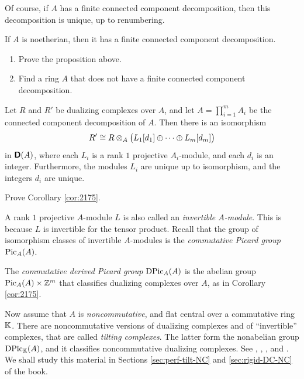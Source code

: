Of course, if $A$ has a finite connected component decomposition, then 
this decomposition is unique, up to renumbering. 

\begin{prop} \label{prop:5080}
If $A$ is noetherian, then it has a finite connected component decomposition.
\end{prop}

\begin{exer} \label{exer:5080} \mbox{}
\begin{enumerate}
\item Prove the proposition above. 

\item Find a ring $A$ that does not have a finite connected component 
decomposition.
\end{enumerate}
\end{exer}

\begin{cor} \label{cor:2175}
Let $R$ and $R'$ be dualizing complexes over $A$, and let 
$A = \prod_{i = 1}^m A_i$ be the connected component decomposition of $A$.
Then there is an isomorphism 
\[ R' \cong R \otimes_A \bigl( L_1[d_1] \oplus \cdots \oplus L_m[d_m] \bigr) \]
in $\boldsymbol{\mathsf{D}}(A)$, where each $L_i$ is a rank $1$ projective 
$A_i$-module, and each $d_i$ is an integer. Furthermore, the modules $L_i$ are 
unique up to isomorphism, and the integers $d_i$ are unique. 
\end{cor}

\begin{exer} \label{exer:2176}
Prove Corollary \ref{cor:2175}.
\end{exer}

\begin{rem} \label{rem:2195}
A rank $1$ projective $A$-module $L$ is also called an {\em invertible 
$A$-module}. This is because $L$ is invertible for the tensor product. 
Recall that the group of isomorphism classes of invertible $A$-modules is 
the {\em commutative Picard group} $\operatorname{Pic}_A(A)$. 

The {\em commutative derived Picard group} $\operatorname{DPic}_A(A)$ is the abelian 
group $\operatorname{Pic}_A(A) \times \mathbb{Z}^m$ that classifies dualizing complexes over 
$A$, as in Corollary \ref{cor:2175}.

Now assume that $A$ is {\em noncommutative}, and flat central over a 
commutative ring $\mathbb{K}$. There are noncommutative versions of dualizing complexes 
and of ``invertible'' complexes, that are called {\em tilting complexes}. The 
latter form the nonabelian group $\operatorname{DPic}_{\mathbb{K}}(A)$, and it classifies 
noncommutative dualizing complexes. See
\cite{Ric1}, \cite{Ric2}, \cite{Kel1}, \cite{Ye4} and \cite{RoZi}. 
We shall study this material in Sections \ref{sec:perf-tilt-NC} 
and \ref{sec:rigid-DC-NC} of the book. 
\end{rem}

